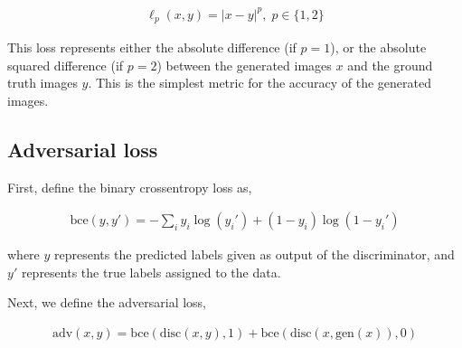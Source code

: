 \documentclass{article}
\begin{document}
\begin{align*}
    \ell_p(x, y) = |x - y|^p,\; p \in \big\{1, 2\big\}
\end{align*}

This loss represents either the absolute difference (if $p = 1$), or the absolute squared difference (if $p = 2$) between the generated images $x$ and the ground truth images $y$. This is the simplest metric for the accuracy of the generated images.

\subsection{Adversarial loss}

First, define the binary crossentropy loss as,

\begin{align*}
    \mathrm{bce}(y, y') = -\sum_i y_i\log(y_i') + (1-y_i)
    \log(1-y_i')
\end{align*}

where $y$ represents the predicted labels given as output of the discriminator, and $y'$ represents the true labels assigned to the data.

Next, we define the adversarial loss,

\begin{align*}
    \mathrm{adv}(x, y) =
    \mathrm{bce}(\mathrm{disc}(x, y), 1) +
    \mathrm{bce}(\mathrm{disc}(x, \mathrm{gen}(x)), 0)
\end{align*}
\end{document}
